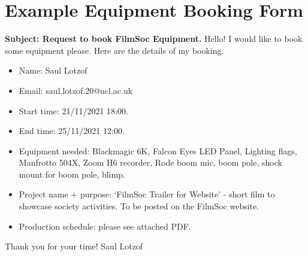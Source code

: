 \documentclass[]{article}
\begin{document}
\section{Example Equipment Booking Form}\label{equipmentForm}
\begin{framed}
    \noindent \textbf{Subject: Request to book FilmSoc Equipment.} \newline
    \newline
    \noindent Hello! \newline
    \newline
    I would like to book some equipment please. Here are the details of my booking.
    \begin{itemize}
        \item Name: Saul Lotzof
        \item Email: saul.lotzof.20@ucl.ac.uk
        \item Start time: 21/11/2021 18:00.
        \item End time: 25/11/2021 12:00.
        \item Equipment needed: Blackmagic 6K, Falcon Eyes LED Panel, Lighting flags, Manfrotto 504X, Zoom H6 recorder, Rode boom mic, boom pole, shock mount for boom pole, blimp.
        \item Project name + purpose: `FilmSoc Trailer for Website' - short film to showcase society activities. To be posted on the FilmSoc website.
        \item Production schedule: please see attached PDF.
    \end{itemize}
    Thank you for your time!\newline
    \newline
    Saul Lotzof
\end{framed}
\end{document}

